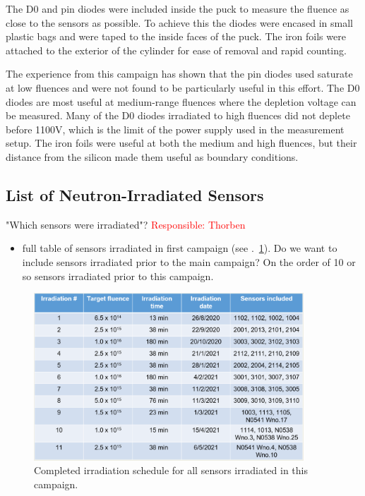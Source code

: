 The D0 and pin diodes were included inside the puck to measure the fluence as close to the sensors as possible.
To achieve this the diodes were encased in small plastic bags and were taped to the inside faces of the puck. 
The iron foils were attached to the exterior of the cylinder for ease of removal and rapid counting. 

The experience from this campaign has shown that the pin diodes used saturate at low fluences and were not found to be particularly useful in this effort. 
The D0 diodes are most useful at medium-range fluences where the depletion voltage can be measured. 
Many of the D0 diodes irradiated to high fluences did not deplete before 1100V, which is the limit of the power supply used in the measurement setup. 
The iron foils were useful at both the medium and high fluences, but their distance from the silicon made them useful as boundary conditions. 

\subsection{List of Neutron-Irradiated Sensors}
\label{subsec:sensors_irradiation}
"Which sensors were irradiated"? \textcolor{red}{Responsible: Thorben}
\begin{itemize}
  \item full table of sensors irradiated in first campaign (see .~\ref{fig:Irradiation_Schedule}). Do we want to include sensors irradiated prior to the main campaign? On the order of 10 or so sensors irradiated prior to this campaign.
\end{itemize}

\begin{figure}[!hbt]
  \begin{center}
    \includegraphics[width=0.90\textwidth]{figures/Completed_Irradiation_Schedule_at_RINSC}
    \caption{Completed irradiation schedule for all sensors irradiated in this campaign.}
    \label{fig:Irradiation_Schedule}
  \end{center}
\end{figure}

